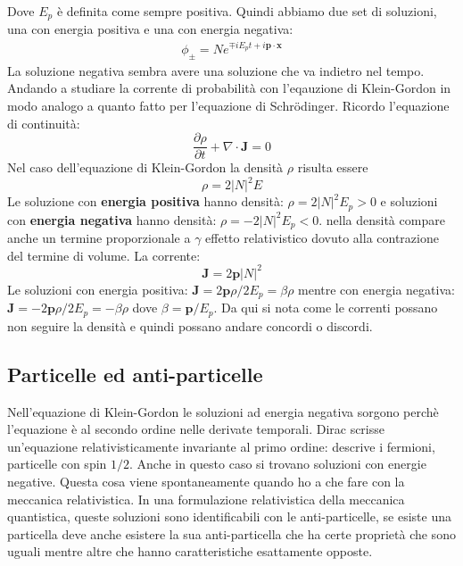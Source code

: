 Dove $E_p$ è definita come sempre positiva. Quindi abbiamo due set di soluzioni, una con energia positiva e una con energia negativa:
\begin{align*}
    \phi_\pm=Ne^{\mp iE_pt+i\mathbf{p}\cdot\mathbf{x}}
\end{align*}
La soluzione negativa sembra avere una soluzione che va indietro nel tempo.
Andando a studiare la corrente di probabilità con l'eqauzione di Klein-Gordon in modo analogo a quanto fatto per l'equazione di Schr\"odinger. Ricordo l'equazione di continuità:
\begin{equation*}
    \frac{\partial \rho}{\partial t} +\nabla\cdot\mathbf{J}=0
\end{equation*}
Nel caso dell'equazione di Klein-Gordon la densità $\rho$ risulta essere
\begin{equation*}
    \rho=2|N|^2E
\end{equation*}
Le soluzione con \textbf{energia positiva} hanno densità: $\rho=2|N|^2E_p>0$ e soluzioni con \textbf{energia negativa} hanno densità: $\rho=-2|N|^2E_p<0$. nella densità compare anche un termine proporzionale a $\gamma$ effetto relativistico dovuto alla contrazione del termine di volume. La corrente:
\begin{equation*}
    \mathbf{J}=2\mathbf{p}|N|^2
\end{equation*}
Le soluzioni con energia positiva: $\mathbf{J}=2\mathbf{p}\rho/2E_p=\beta\rho$ mentre con energia negativa: $\mathbf{J}=-2\mathbf{p}\rho/2E_p=-\beta\rho$ dove $\beta=\mathbf{p}/E_p$. Da qui si nota come le correnti possano non seguire la densità e quindi possano andare concordi o discordi.
\subsection{Particelle ed anti-particelle}
Nell'equazione di Klein-Gordon le soluzioni ad energia negativa sorgono perchè l'equazione è al secondo ordine nelle derivate temporali. Dirac scrisse un'equazione relativisticamente invariante al primo ordine: descrive i fermioni, particelle con spin $1/2$. Anche in questo caso si trovano soluzioni con energie negative. Questa cosa viene spontaneamente quando ho a che fare con la meccanica relativistica. In una formulazione relativistica della meccanica quantistica, queste soluzioni sono identificabili con le anti-particelle, se esiste una particella deve anche esistere la sua anti-particella che ha certe proprietà che sono uguali mentre altre che hanno caratteristiche esattamente opposte. 

